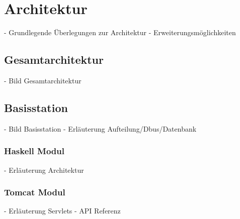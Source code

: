 \section{Architektur}
- Grundlegende Überlegungen zur Architektur
- Erweiterungsmöglichkeiten
\subsection{Gesamtarchitektur}
- Bild Gesamtarchitektur
\subsection{Basisstation}
- Bild Basisstation
- Erläuterung Aufteilung/Dbus/Datenbank
\subsubsection{Haskell Modul}
- Erläuterung Architektur
\subsubsection{Tomcat Modul}
- Erläuterung Servlets
- API Referenz
